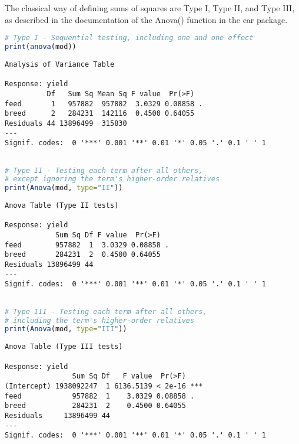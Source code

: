 \label{types-of-sums-of-squares}

The classical way of defining sums of squares are Type I, Type II, and
Type III, as described in the documentation of the Anova() function in
the car package.

\begin{lstlisting}[language=R, columns=fullflexible, basicstyle=\linespread{0.85}\small\ttfamily, stringstyle=\color{DarkGreen}, keywordstyle=\color{blue}, commentstyle=\color{DarkGreen},]
# Type I - Sequential testing, including one and one effect
print(anova(mod))
\end{lstlisting}
\begin{Verbatim}[fontsize=\small]
Analysis of Variance Table

Response: yield
          Df   Sum Sq Mean Sq F value  Pr(>F)
feed       1   957882  957882  3.0329 0.08858 .
breed      2   284231  142116  0.4500 0.64055
Residuals 44 13896499  315830
---
Signif. codes:  0 '***' 0.001 '**' 0.01 '*' 0.05 '.' 0.1 ' ' 1
\end{Verbatim}
\begin{lstlisting}[language=R, columns=fullflexible, basicstyle=\linespread{0.85}\small\ttfamily, stringstyle=\color{DarkGreen}, keywordstyle=\color{blue}, commentstyle=\color{DarkGreen},]

# Type II - Testing each term after all others,
# except ignoring the term's higher-order relatives
print(Anova(mod, type="II"))
\end{lstlisting}
\begin{Verbatim}[fontsize=\small]
Anova Table (Type II tests)

Response: yield
            Sum Sq Df F value  Pr(>F)
feed        957882  1  3.0329 0.08858 .
breed       284231  2  0.4500 0.64055
Residuals 13896499 44
---
Signif. codes:  0 '***' 0.001 '**' 0.01 '*' 0.05 '.' 0.1 ' ' 1
\end{Verbatim}
\begin{lstlisting}[language=R, columns=fullflexible, basicstyle=\linespread{0.85}\small\ttfamily, stringstyle=\color{DarkGreen}, keywordstyle=\color{blue}, commentstyle=\color{DarkGreen},]

# Type III - Testing each term after all others,
# including the term's higher-order relatives
print(Anova(mod, type="III"))
\end{lstlisting}
\begin{Verbatim}[fontsize=\small]
Anova Table (Type III tests)

Response: yield
                Sum Sq Df   F value  Pr(>F)
(Intercept) 1938092247  1 6136.5139 < 2e-16 ***
feed            957882  1    3.0329 0.08858 .
breed           284231  2    0.4500 0.64055
Residuals     13896499 44
---
Signif. codes:  0 '***' 0.001 '**' 0.01 '*' 0.05 '.' 0.1 ' ' 1
\end{Verbatim}

